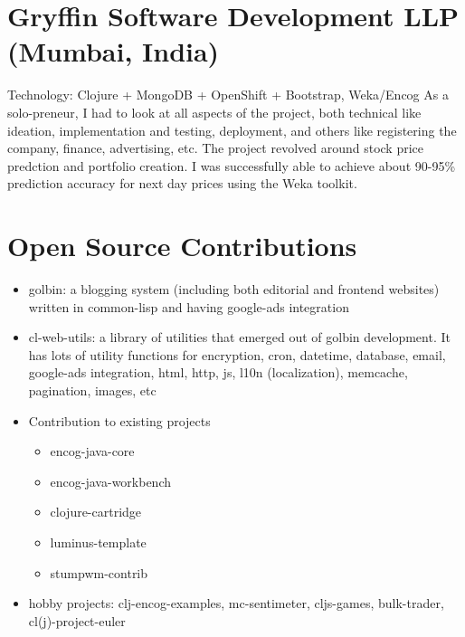 \section{Gryffin Software Development LLP (Mumbai, India)}
         {}{Technology: Clojure + MongoDB + OpenShift + Bootstrap, Weka/Encog}
         {As a solo-preneur, I had to look at all aspects of the project, both technical like ideation, implementation and testing, deployment, and others like registering the company, finance, advertising, etc.
           The project revolved around stock price predction and portfolio creation. I was successfully able to achieve about 90-95\% prediction accuracy for next day prices using the Weka toolkit.}

\section{Open Source Contributions}
         {\begin{itemize}
           \item golbin: a blogging system (including both editorial and frontend websites) written in common-lisp and having google-ads integration
           \item cl-web-utils: a library of utilities that emerged out of golbin development. It has lots of utility functions for encryption, cron, datetime, database, email, google-ads integration, html, http, js, l10n (localization), memcache, pagination, images, etc
           \item Contribution to existing projects
             \begin{itemize}
             \item encog-java-core
             \item encog-java-workbench
             \item clojure-cartridge
             \item luminus-template
             \item stumpwm-contrib
             \end{itemize}
           \item hobby projects: clj-encog-examples, mc-sentimeter, cljs-games, bulk-trader, cl(j)-project-euler
         \end{itemize}}

